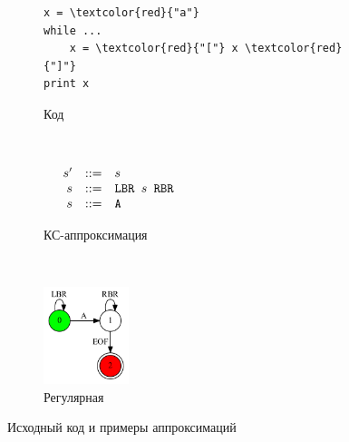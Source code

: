\begin{figure}[h]
	\centering
	\begin{subfigure}[h!]{0.3\textwidth}
		\centering
		\begin{minipage}{4cm}
			\begin{Verbatim}[commandchars=\\\{\}]
x = \textcolor{red}{"a"}
while ...
    x = \textcolor{red}{"["} x \textcolor{red}{"]"}
print x
			\end{Verbatim}
		\end{minipage}
		\caption{Код}
		\label{fig:code}
	\end{subfigure}
	~
	\begin{subfigure}[h!]{0.3\textwidth}
		\centering
		$
		\begin{array}{crcl}
			&s' &::=& s \\
			&s & ::= & \mbox{\texttt{LBR }} s \mbox{\texttt{ RBR}}\\
			&s & ::= & \mbox{\texttt{A}}
		\end{array}
		$
		\caption{КС-аппроксимация}
		\label{fig:app_cf}
	\end{subfigure}
	~
	\begin{subfigure}[h!]{0.3\textwidth}
		\centering
		\includegraphics[width=2.5cm]{pictures/reg_app}
		\caption{Регулярная}
		\label{fig:app_r}
	\end{subfigure}
	\caption{Исходный код и примеры аппроксимаций}
	\label{example}
\end{figure}